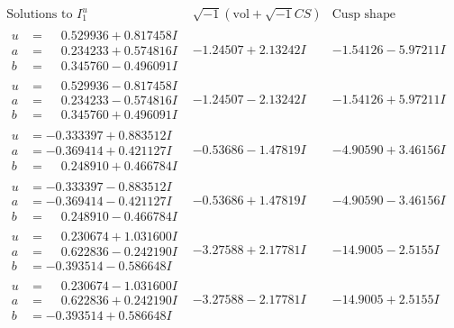 \documentclass[1p]{elsarticle_modified}
\theoremstyle{definition}
\newcommand{\I}{\sqrt{-1}}
\begin{document}
$$\begin{array}{c|c|c}  
\text{Solutions to }I^u_{1}& \I (\text{vol} + \sqrt{-1}CS) & \text{Cusp shape}\\
 \hline 
\begin{aligned}
u &= \phantom{-}0.529936 + 0.817458 I \\
a &= \phantom{-}0.234233 + 0.574816 I \\
b &= \phantom{-}0.345760 - 0.496091 I\end{aligned}
 & -1.24507 + 2.13242 I & -1.54126 - 5.97211 I \\ \hline\begin{aligned}
u &= \phantom{-}0.529936 - 0.817458 I \\
a &= \phantom{-}0.234233 - 0.574816 I \\
b &= \phantom{-}0.345760 + 0.496091 I\end{aligned}
 & -1.24507 - 2.13242 I & -1.54126 + 5.97211 I \\ \hline\begin{aligned}
u &= -0.333397 + 0.883512 I \\
a &= -0.369414 + 0.421127 I \\
b &= \phantom{-}0.248910 + 0.466784 I\end{aligned}
 & -0.53686 - 1.47819 I & -4.90590 + 3.46156 I \\ \hline\begin{aligned}
u &= -0.333397 - 0.883512 I \\
a &= -0.369414 - 0.421127 I \\
b &= \phantom{-}0.248910 - 0.466784 I\end{aligned}
 & -0.53686 + 1.47819 I & -4.90590 - 3.46156 I \\ \hline\begin{aligned}
u &= \phantom{-}0.230674 + 1.031600 I \\
a &= \phantom{-}0.622836 - 0.242190 I \\
b &= -0.393514 - 0.586648 I\end{aligned}
 & -3.27588 + 2.17781 I & -14.9005 - 2.5155 I \\ \hline\begin{aligned}
u &= \phantom{-}0.230674 - 1.031600 I \\
a &= \phantom{-}0.622836 + 0.242190 I \\
b &= -0.393514 + 0.586648 I\end{aligned}
 & -3.27588 - 2.17781 I & -14.9005 + 2.5155 I \\ \hline\begin{aligned}

\end{aligned}
\end{array}$$
\end{document}
